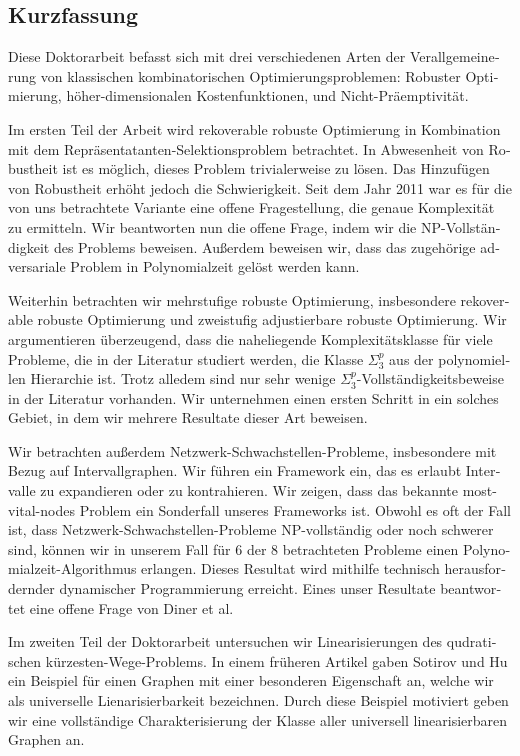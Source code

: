\documentclass[twoside,openright,bibliography=totoc]{scrreprt}
\begin{document}
\begin{otherlanguage}{ngerman}
\chapter*{Kurzfassung}

Diese Doktorarbeit befasst sich mit drei verschiedenen Arten der Verallgemeinerung von klassischen kombinatorischen Optimierungsproblemen: Robuster Optimierung, höher-dimensionalen Kostenfunktionen, und Nicht-Präemptivität.


Im ersten Teil der Arbeit wird rekoverable robuste Optimierung in Kombination mit dem Repräsentatanten-Selektionsproblem betrachtet. 
In Abwesenheit von Robustheit ist es möglich, dieses Problem trivialerweise zu lösen. 
Das Hinzufügen von Robustheit erhöht jedoch die Schwierigkeit. 
Seit dem Jahr 2011 war es für die von uns betrachtete Variante eine offene Fragestellung, die genaue Komplexität zu ermitteln. Wir beantworten nun die offene Frage, indem wir die NP-Vollständigkeit des Problems beweisen.
Außerdem beweisen wir, dass das zugehörige adversariale Problem in Polynomialzeit gelöst werden kann. 

Weiterhin betrachten wir mehrstufige robuste Optimierung, insbesondere rekoverable robuste Optimierung und zweistufig adjustierbare robuste Optimierung. 
Wir argumentieren überzeugend, dass die naheliegende Komplexitätsklasse für viele Probleme, die in der Literatur studiert werden, die Klasse $\Sigma^p_3$ aus der polynomiellen Hierarchie ist. Trotz alledem sind nur sehr wenige $\Sigma^p_3$-Vollständigkeitsbeweise in der Literatur vorhanden. Wir unternehmen einen ersten Schritt in ein solches Gebiet, in dem wir mehrere Resultate dieser Art beweisen. 

Wir betrachten außerdem Netzwerk-Schwachstellen-Probleme, insbesondere mit Bezug auf Intervallgraphen. Wir führen ein Framework ein, das es erlaubt Intervalle zu expandieren oder zu kontrahieren. Wir zeigen, dass das bekannte most-vital-nodes Problem ein Sonderfall unseres Frameworks ist. Obwohl es oft der Fall ist, dass Netzwerk-Schwachstellen-Probleme NP-vollständig oder noch schwerer sind, können wir in unserem Fall für 6 der 8 betrachteten Probleme einen Polynomialzeit-Algorithmus erlangen. Dieses Resultat wird mithilfe technisch herausfordernder dynamischer Programmierung erreicht. Eines unser Resultate beantwortet eine offene Frage von Diner et al.


Im zweiten Teil der Doktorarbeit untersuchen wir Linearisierungen des qudratischen kürzesten-Wege-Problems. 
In einem früheren Artikel gaben Sotirov und Hu ein Beispiel für einen Graphen mit einer besonderen Eigenschaft an, welche wir als universelle Lienarisierbarkeit bezeichnen. 
Durch diese Beispiel motiviert geben wir eine vollständige Charakterisierung der Klasse aller universell linearisierbaren Graphen an.


\end{otherlanguage}
\end{document}
